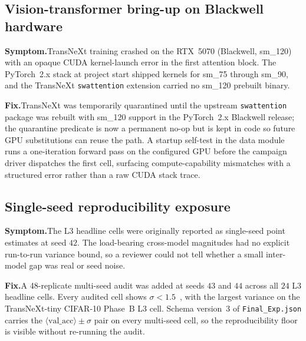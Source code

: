 \subsection{Vision-transformer bring-up on Blackwell hardware}
\textbf{Symptom.}\quad TransNeXt training crashed on the RTX~5070 (Blackwell,
sm\_120) with an opaque CUDA kernel-launch error in the first attention block.
The PyTorch~2.x stack at project start shipped kernels for sm\_75 through sm\_90,
and the TransNeXt \texttt{swattention} extension carried no sm\_120 prebuilt
binary.

\textbf{Fix.}\quad TransNeXt was temporarily quarantined until the upstream
\texttt{swattention} package was rebuilt with sm\_120 support in the PyTorch~2.x
Blackwell release; the quarantine predicate is now a permanent no-op but is kept
in code so future GPU substitutions can reuse the path. A startup self-test in
the data module runs a one-iteration forward pass on the configured GPU before
the campaign driver dispatches the first cell, surfacing compute-capability
mismatches with a structured error rather than a raw CUDA stack trace.

\subsection{Single-seed reproducibility exposure}
\textbf{Symptom.}\quad The L3 headline cells were originally reported as
single-seed point estimates at seed $42$. The load-bearing cross-model
magnitudes had no explicit run-to-run variance bound, so a reviewer could not
tell whether a small inter-model gap was real or seed noise.

\textbf{Fix.}\quad A 48-replicate multi-seed audit was added at seeds $43$ and
$44$ across all $24$ L3 headline cells. Every audited cell shows
$\sigma < 1.5$~\Mpp{}, with the largest variance on the TransNeXt-tiny CIFAR-10
Phase~B L3 cell. Schema version~3 of \texttt{Final\_Exp.json} carries the
$\langle\mathrm{val\_acc}\rangle \pm \sigma$ pair on every multi-seed cell, so
the reproducibility floor is visible without re-running the audit.
